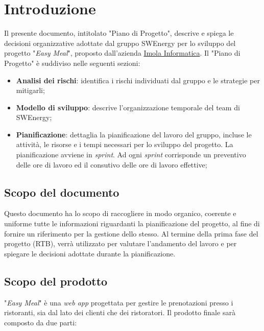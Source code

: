\section{Introduzione}

Il presente documento, intitolato "Piano di Progetto", descrive e spiega le
decisioni organizzative adottate dal gruppo SWEnergy per lo sviluppo del
progetto "\textit{Easy Meal}", proposto dall'azienda
\href{https://imolainformatica.it/}{Imola Informatica}. Il "Piano di Progetto" è
suddiviso nelle seguenti sezioni:

\begin{itemize}
	\item \textbf{Analisi dei rischi}: identifica i rischi individuati dal
	      gruppo e le strategie per mitigarli;

	\item \textbf{Modello di sviluppo}: descrive l'organizzazione temporale del
	      team di SWEnergy;

	\item \textbf{Pianificazione}: dettaglia la pianificazione del lavoro del
	      gruppo, incluse le attività, le risorse e i tempi necessari per lo
	      sviluppo del progetto. La pianificazione avviene in \textit{sprint}.
	      Ad ogni \textit{sprint} corrisponde un preventivo delle ore di
	      lavoro ed il consutivo delle ore di lavoro effettive;
\end{itemize}

\subsection{Scopo del documento}

Questo documento ha lo scopo di raccogliere in modo organico, coerente e
uniforme tutte le informazioni riguardanti la pianificazione del progetto, al
fine di fornire un riferimento per la gestione dello stesso. Al termine della
prima fase del progetto (RTB), verrà utilizzato per valutare l'andamento del
lavoro e per spiegare le decisioni adottate durante la pianificazione.

\subsection{Scopo del prodotto}

"\textit{Easy Meal}" è una \textit{web app} progettata per gestire le
prenotazioni presso i ristoranti, sia dal lato dei clienti che dei ristoratori.
Il prodotto finale sarà composto da due parti:

